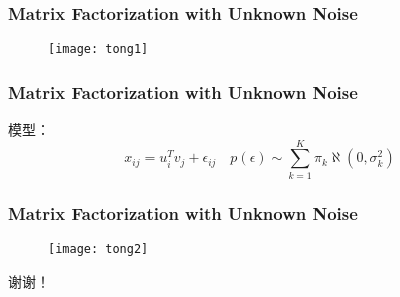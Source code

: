 \documentclass[notheorems,mathserif,table,compress]{beamer}  %
\begin{document}
\begin{frame}
\frametitle{Matrix Factorization with Unknown Noise}
\begin{figure}
\texttt{[image: tong1]}
\end{figure}
\end{frame}

\begin{frame}
\frametitle{Matrix Factorization with Unknown Noise}
模型：
\begin{equation}
x_{ij}=u_i^Tv_j+\epsilon_{ij}\quad p(\epsilon)\sim \sum_{k=1}^{K}\pi_k\aleph(0,\sigma_k^2)
\end{equation}
\end{frame}

\begin{frame}
\frametitle{Matrix Factorization with Unknown Noise}
\begin{figure}
\texttt{[image: tong2]}
\end{figure}
\end{frame}



\begin{frame}
\begin{center}
谢谢！
\end{center}
\end{frame}
\end{document}

